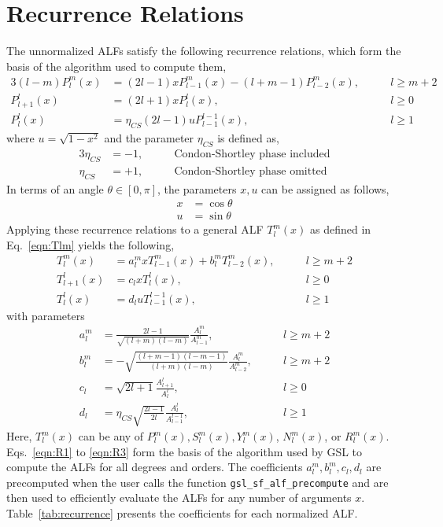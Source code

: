 \documentclass[12pt]{article}
\begin{document}
\section{Recurrence Relations}
\label{sec:recur}

The unnormalized ALFs satisfy the following recurrence relations,
which form the basis of the algorithm used to compute them,
\begin{alignat}{3}
\left(l-m\right) P_l^m(x) &= \left( 2l-1 \right) x P_{l-1}^m(x) - \left( l+m-1 \right) P_{l-2}^m(x), & \qquad l \geq m + 2 \\
P_{l+1}^l(x) &= \left( 2l+1 \right) x P_l^l(x), & \qquad l \geq 0 \\
P_l^l(x) &= \eta_{CS} \left( 2l-1 \right) u P_{l-1}^{l-1}(x), & \qquad l \geq 1
\end{alignat}
where $u = \sqrt{1 - x^2}$ and the parameter $\eta_{CS}$ is defined as,
\begin{alignat}{3}
\eta_{CS} &= -1, & \qquad \textrm{Condon-Shortley phase included} \\
\eta_{CS} &= +1, & \qquad \textrm{Condon-Shortley phase omitted}
\end{alignat}
In terms of an angle $\theta \in [0,\pi]$, the parameters $x,u$ can
be assigned as follows,
\begin{align}
x &= \cos{\theta} \\
u &= \sin{\theta}
\end{align}
Applying these recurrence relations to a general ALF
$T_l^m(x)$ as defined in Eq.~\eqref{eqn:Tlm} yields the following,
\begin{subequations}
\begin{alignat}{3}
T_l^m(x) &= a_l^m x T_{l-1}^m(x) + b_l^m T_{l-2}^m(x), & \qquad l \geq m + 2 \label{eqn:R1} \\
T_{l+1}^l(x) &= c_l x T_l^l(x), & \qquad l \geq 0 \\
T_l^l(x) &= d_l u T_{l-1}^{l-1}(x), & \qquad l \geq 1 \label{eqn:R3}
\end{alignat}
\end{subequations}
with parameters
\begin{subequations}
\begin{alignat}{3}
a_l^m &= \frac{2l-1}{\sqrt{(l+m)(l-m)}} \frac{A_l^m}{A_{l-1}^m}, & \qquad l \geq m + 2 \\
b_l^m &= -\sqrt{\frac{(l+m-1)(l-m-1)}{(l+m)(l-m)}} \frac{A_l^m}{A_{l-2}^m}, & \qquad l \geq m + 2 \\
c_l &= \sqrt{2l+1} \frac{A_{l+1}^l}{A_l^l}, & \qquad l \geq 0 \\
d_l &= \eta_{CS} \sqrt{\frac{2l-1}{2l}} \frac{A_l^l}{A_{l-1}^{l-1}}, & \qquad l \geq 1
\end{alignat}
\end{subequations}
Here, $T_l^m(x)$ can be any of $P_l^m(x), S_l^m(x), Y_l^m(x)$, $N_l^m(x)$,
or $R_l^m(x)$. Eqs.~\eqref{eqn:R1} to \eqref{eqn:R3} form the basis of
the algorithm used by GSL to compute the ALFs for all degrees and orders.
The coefficients $a_l^m,b_l^m,c_l,d_l$ are precomputed when the user
calls the function {\tt gsl\_sf\_alf\_precompute} and are then
used to efficiently evaluate the ALFs for any number of arguments $x$.
Table~\ref{tab:recurrence} presents the coefficients for each
normalized ALF.
\end{document}
